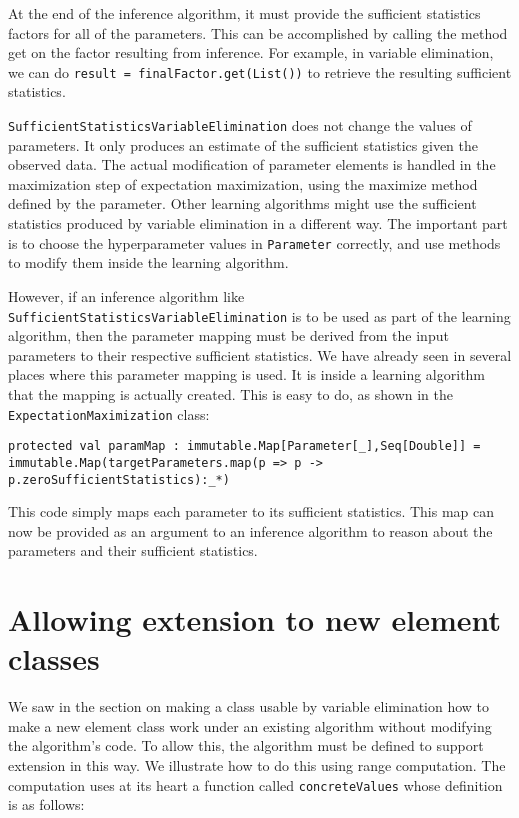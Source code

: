At the end of the inference algorithm, it must provide the sufficient statistics factors for all of the parameters. This can be accomplished by calling the method get on the factor resulting from inference. For example, in variable elimination, we can do \texttt{result = finalFactor.get(List())} to retrieve the resulting sufficient statistics.

\texttt{SufficientStat\-isticsVariableElimination} does not change the values of parameters. It only produces an estimate of the sufficient statistics given the observed data. The actual modification of parameter elements is handled in the maximization step of expectation maximization, using the maximize method defined by the parameter. Other learning algorithms might use the sufficient statistics produced by variable elimination in a different way. The important part is to choose the hyperparameter values in \texttt{Parameter} correctly, and use methods to modify them inside the learning algorithm.

However, if an inference algorithm like \texttt{SufficientStatisticsVari\-ableElimination} is to be used as part of the learning algorithm, then the parameter mapping must be derived from the input parameters to their respective sufficient statistics. We have already seen in several places where this parameter mapping is used. It is inside a learning algorithm that the mapping is actually created. This is
easy to do, as shown in the \texttt{ExpectationMaximization} class:

\begin{flushleft}
\texttt{protected val paramMap : immutable.Map[Parameter[\_],Seq[Double]] = 
\newline immutable.Map(targetParameters.map(p => p -> p.zeroSufficientStatistics):\_*)
}
\end{flushleft}

This code simply maps each parameter to its sufficient statistics. This map can now be provided as an argument to an inference algorithm to reason about the parameters and their sufficient statistics.

\section{Allowing extension to new element classes}

We saw in the section on making a class usable by variable elimination how to make a new element class work under an existing algorithm without modifying the algorithm's code. To allow this, the algorithm must be defined to support extension in this way. We illustrate how to do this using range computation. The computation uses at its heart a function called \texttt{concreteValues} whose definition is as follows:


